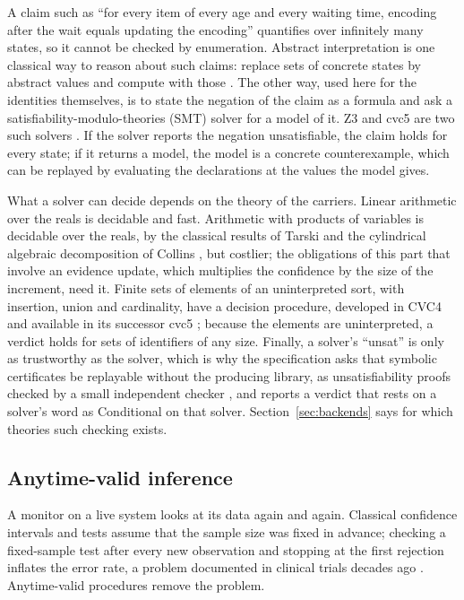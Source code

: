\documentclass[11pt]{article}
\theoremstyle{definition}
\theoremstyle{plain}
\begin{document}
A claim such as ``for every item of every age and every waiting time, encoding after the wait
equals updating the encoding'' quantifies over infinitely many states, so it cannot be checked by
enumeration. Abstract interpretation is one classical way to reason about such claims: replace sets
of concrete states by abstract values and compute with those \cite{cousot}. The other way, used
here for the identities themselves, is to state the negation of the claim as a formula and ask a
satisfiability-modulo-theories (SMT) solver for a model of it. Z3 and cvc5 are two such solvers
\cite{z3,cvc5}. If the solver reports the negation unsatisfiable, the claim holds for every state;
if it returns a model, the model is a concrete counterexample, which can be replayed by evaluating
the declarations at the values the model gives.

What a solver can decide depends on the theory of the carriers. Linear arithmetic over the reals
is decidable and fast. Arithmetic with products of variables is decidable over the reals, by the
classical results of Tarski and the cylindrical algebraic decomposition of Collins
\cite{tarski,collins}, but costlier; the obligations of this part that involve an evidence update,
which multiplies the confidence by the size of the increment, need it. Finite sets of elements of
an uninterpreted sort, with insertion, union and cardinality, have a decision procedure, developed
in CVC4 and available in its successor cvc5 \cite{finitesets}; because the elements are
uninterpreted, a verdict holds for sets of identifiers of any size. Finally, a solver's ``unsat''
is only as trustworthy as the solver, which is why the specification asks that symbolic
certificates be replayable without the producing library, as unsatisfiability proofs checked by a
small independent checker \cite[Section~15.3]{spec}, and reports a verdict that rests on a solver's
word as Conditional on that solver. Section~\ref{sec:backends} says for which theories such checking
exists.

\subsection{Anytime-valid inference}\label{sec:bg-anytime}

A monitor on a live system looks at its data again and again. Classical confidence intervals and
tests assume that the sample size was fixed in advance; checking a fixed-sample test after every
new observation and stopping at the first rejection inflates the error rate, a problem documented
in clinical trials decades ago \cite{armitage}. Anytime-valid procedures remove the problem.
\end{document}
